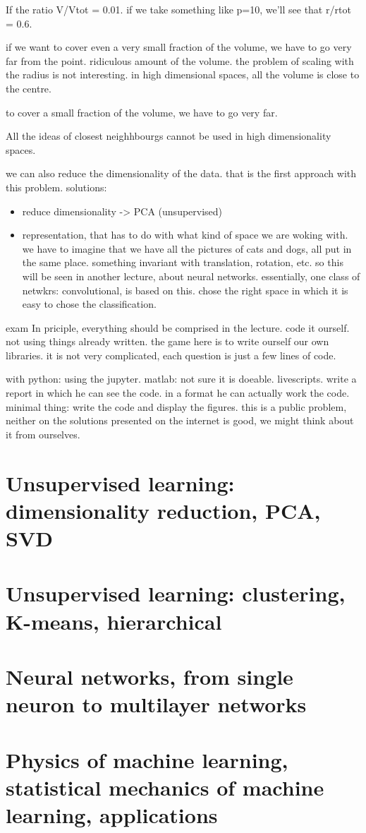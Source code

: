 \documentclass[a4paper]{tufte-book}
\begin{document}
If the ratio V/Vtot = 0.01.
if we take something like p=10, we'll see that r/rtot = 0.6.

if we want to cover even a very small fraction of the volume, we have to go very
far from the point.
ridiculous amount of the volume.
the problem of scaling with the radius is not interesting.
in high dimensional spaces, all the volume is close to the centre.

to cover a small fraction of the volume, we have to go very far.

All the ideas of closest neighhbourgs cannot be used in high dimensionality
spaces.

we can also reduce the dimensionality of the data. that is the first approach
with this problem.
solutions:
\begin{itemize}
    \item reduce dimensionality -> PCA (unsupervised)
    \item representation, that has to do with what kind of space we are woking with. we have to imagine that we have all the pictures of cats and
        dogs, all put in the same place.
        something invariant with translation, rotation, etc. so this will be seen in another lecture, about neural networks. essentially, one
        class of netwkrs: convolutional, is based on this. chose the right space
        in which it is easy to chose the classification.
\end{itemize}

exam
In priciple, everything should be comprised in the lecture.
code it ourself. not using things already written. the game here is to write
ourself our own libraries. it is not very complicated, each question is just
a few lines of code.

with python: using the jupyter.
matlab: not sure it is doeable. livescripts.
write a report in which he can see the code. in a format he can actually work
the code.
minimal thing: write the code and display the figures.
this is a public problem, neither on the solutions presented on the internet is
good, we might think about it from ourselves.





\chapter{Unsupervised learning: dimensionality reduction, PCA, SVD}
\label{ch:unsupervised-1}
\chapter{Unsupervised learning: clustering, K-means, hierarchical}
\label{ch:unsupervised-2}

\chapter{Neural networks, from single neuron to multilayer networks}
\label{ch:neural-networks}

\chapter{Physics of machine learning, statistical mechanics of machine learning, applications}
\label{ch:physics}
\end{document}
